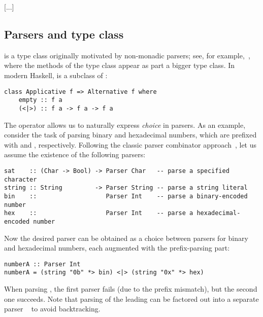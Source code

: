 [...]

\subsection{Parsers and  type class}\label{sec-alternative-functors}

 is a type class originally motivated by non-monadic parsers;
see, for example,~\citet{swierstra1996parsers}, where the methods of the
 type class appear as part a bigger  type class. In
modern Haskell,  is a subclass of :

\vspace{1mm}
\begin{verbatim}
class Applicative f => Alternative f where
    empty :: f a
    (<|>) :: f a -> f a -> f a
\end{verbatim}
\vspace{1mm}

\noindent
The operator \hs{<|>} allows us to naturally express \emph{choice} in parsers.
As an example, consider the task of parsing binary and hexadecimal numbers,
which are prefixed with  and , respectively. Following the
classic parser combinator approach~\citep{hutton1998monadic}, let us assume the
existence of the following parsers:

\vspace{1mm}
\begin{verbatim}
sat    :: (Char -> Bool) -> Parser Char   -- parse a specified character
string :: String         -> Parser String -- parse a string literal
bin    ::                   Parser Int    -- parse a binary-encoded number
hex    ::                   Parser Int    -- parse a hexadecimal-encoded number
\end{verbatim}
\vspace{1mm}

\noindent
Now the desired parser can be obtained as a choice between parsers for binary
and hexadecimal numbers, each augmented with the prefix-parsing part:

\vspace{1mm}
\begin{verbatim}
numberA :: Parser Int
numberA = (string "0b" *> bin) <|> (string "0x" *> hex)
\end{verbatim}
\vspace{1mm}

\noindent
When parsing , the first parser fails (due to the prefix mismatch),
but the second one succeeds. Note that parsing of the leading  can be
factored out into a separate parser ~ to avoid backtracking.

